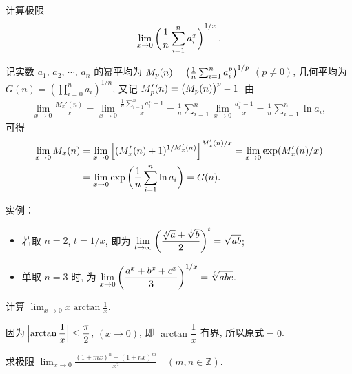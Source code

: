 \begin{exercise}[$(1 + 1/x)^x$ 型]
    计算极限
    \[
    \lim_{x \to 0} \del[3]{\frac 1n \sum_{i = 1}^{n}a_i^x}^{1/x}.
    \]
\end{exercise}
\begin{solution}
    记实数 $a_1$, $a_2$, $\cdots$, $a_n$ 的幂平均为 $M_p(n) = \del[1]{\frac 1n \sum_{i = 1}^{n}a_i^p}^{1/p}$ $(p \neq 0)$, 几何平均为 $G(n) = (\prod_{i = 0}^{n} a_i)^{1/n}$, 又记 $M_p'(n) = \del[1]{M_p(n)}^p - 1$. 由
    \begin{align*}
    \lim_{x \to 0} \frac{M_x'(n)}{x} 
    = \lim_{x \to 0} \frac{\frac1n \sum_{i = 1}^{n}a_i^x - 1}{x}
    = \frac 1n \sum_{i = 1}^{n} \lim_{x \to 0} \frac{a_i^x - 1}{x}
    = \frac 1n \sum_{i = 1}^{n} \ln a_i,
    \end{align*}
    可得
    \begin{align*}
    \lim_{x \to 0} M_x(n)
    &= \lim_{x \to 0} \sbr[2]{(M_x'(n) + 1)^{1/M_x'(n)}}^{M_x'(n)/x}
    = \lim_{x \to 0} \exp(M_x'(n)/x) \\
    &= \lim_{x \to 0} \exp\del[3]{\frac 1n \sum_{i = 1}^{n} \ln a_i}
    = G(n).
    \end{align*}
    
    实例：
    \begin{itemize}
        \item 若取 $n = 2$, $t = 1/x$, 即为 $\displaystyle \lim_{t \to \infty} \del[3]{\frac{\sqrt[t]{a} + \sqrt[t]{b}}{2}}^t = \sqrt{ab}$;
        \item 单取 $n = 3$ 时, 为 $\displaystyle \lim_{x \to 0} \del[3]{\frac{a^x + b^x + c^x}{3}}^{1/x} = \sqrt[3]{abc}$.
    \end{itemize} 
\end{solution}


\begin{exercise}[函数有界性]
    计算 $\displaystyle \lim_{x\to0}x\arctan\frac 1x$.
\end{exercise}

\begin{solution}
    因为 $\displaystyle \abs[2]{\arctan\frac 1x} \leq \frac \pi2$, $(x \to 0)$,  即 $\arctan\dfrac 1x$ 有界, 所以原式$=0$.
\end{solution}

\begin{exercise}[含参数]
    求极限 $\displaystyle \lim_{x \to 0} \frac{(1+mx)^n - (1+nx)^m}{x^2} \quad (m, n \in \mathbb{Z})$.
\end{exercise}

